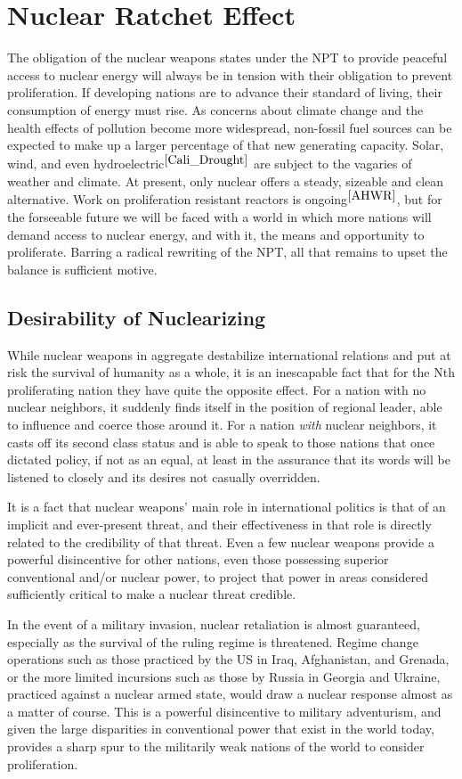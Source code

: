 \documentclass[journal]{IEEEtran}
\begin{document}
\section{Nuclear Ratchet Effect}
The obligation of the nuclear weapons states under the NPT to provide peaceful access to nuclear energy will always be in tension with their obligation to prevent proliferation.  If developing nations are to advance their standard of living, their consumption of energy must rise.  As concerns about climate change and the health effects of pollution become more widespread, non-fossil fuel sources can be expected to make up a larger percentage of that new generating capacity.  Solar, wind, and even hydroelectric$^{\cite{Cali_Drought}}$ are subject to the vagaries of weather and climate.  At present, only nuclear offers a steady, sizeable and clean alternative.  Work on proliferation resistant reactors is ongoing$^{\cite{AHWR}}$, but for the forseeable future we will be faced with a world in which more nations will demand access to nuclear energy, and with it, the means and opportunity to proliferate.  Barring a radical rewriting of the NPT, all that remains to upset the balance is sufficient motive.
\subsection{Desirability of Nuclearizing}
While nuclear weapons in aggregate destabilize international relations and put at risk the survival of humanity as a whole, it is an inescapable fact that for the Nth proliferating nation they have quite the opposite effect.  For a nation with no nuclear neighbors, it suddenly finds itself in the position of regional leader, able to influence and coerce those around it.  For a nation \textit{with} nuclear neighbors, it casts off its second class status and is able to speak to those nations that once dictated policy, if not as an equal, at least in the assurance that its words will be listened to closely and its desires not casually overridden.\par
It is a fact that nuclear weapons' main role in international politics is that of an implicit and ever-present threat, and their effectiveness in that role is directly related to the credibility of that threat. Even a few nuclear weapons provide a powerful disincentive for other nations, even those possessing superior conventional and/or nuclear power, to project that power in areas considered sufficiently critical to make a nuclear threat credible.\par
In the event of a military invasion, nuclear retaliation is almost guaranteed, especially as the survival of the ruling regime is threatened.  Regime change operations such as those practiced by the US in Iraq, Afghanistan, and Grenada, or the more limited incursions such as those by Russia in Georgia and Ukraine, practiced against a nuclear armed state, would draw a nuclear response almost as a matter of course.  This is a powerful disincentive to military adventurism, and given the large disparities in conventional power that exist in the world today, provides a sharp spur to the militarily weak nations of the world to consider proliferation.\par
\end{document}
